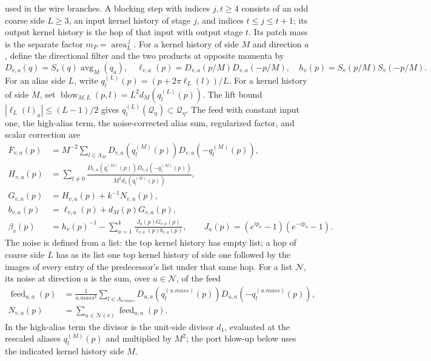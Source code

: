 used in the wire branches. A blocking step with indices $j,t\geq4$ consists of an
odd coarse side $L\geq3$, an input kernel history of stage $j$, and indices
$t\leq j\leq t+1$; its output kernel history is the hop of that input with output
stage $t$. Its patch mass is the separate factor
$m_P=\operatorname{area}_L^{\,j}$.
For a kernel history of side $M$ and direction $a$, define the directional filter and the two products at opposite momenta by
\[
 D_{v,a}(q)=S_v(q)\operatorname{avg}_M(q_a),\quad
 \ell_{v,a}(p)=D_{v,a}(p/M)D_{v,a}(-p/M),\quad
 h_v(p)=S_v(p/M)S_v(-p/M).
\]
For an alias side $L$, write $q_l^{(L)}(p)=(p+2\pi\ell_L(l))/L$. For a kernel history of side $M$, set $\operatorname{blow}_{M,L}(p,l)=L^2d_M(q_l^{(L)}(p))$. The lift bound $|\ell_L(l)_a|\leq(L-1)/2$ gives $q_l^{(L)}(\mathcal Q_\eta)\subset\mathcal Q_\eta$. The feed with constant
input one, the high-alias term, the noise-corrected alias sum, regularized factor, and scalar correction are
\[
\begin{aligned}
 F_{v,a}(p)&=M^{-2}\sum_{l\in\Lambda_M}
       D_{v,a}(q_l^{(M)}(p))D_{v,a}(-q_l^{(M)}(p)),\\
 H_{v,a}(p)&=\sum_{l\ne0}
       \frac{D_{v,a}(q_l^{(M)}(p))D_{v,a}(-q_l^{(M)}(p))}
            {M^2d_1(q_l^{(M)}(p))},\\
 G_{v,a}(p)&=H_{v,a}(p)+k^{-1}N_{v,a}(p),\\
 b_{v,a}(p)&=\ell_{v,a}(p)+d_M(p)G_{v,a}(p),\\
 \beta_v(p)&=h_v(p)^{-1}-\sum_{a=1}^4
      \frac{J_a(p)G_{v,a}(p)}{\ell_{v,a}(p)b_{v,a}(p)},
 \qquad J_a(p)=(e^{ip_a}-1)(e^{-ip_a}-1).
\end{aligned}
\]
The noise is defined from a list: the top kernel history has empty list; a hop of
coarse side $L$ has as its list one top kernel history of side one followed by the
images of every entry of the predecessor's list under that same hop.
For a list $\mathcal N$, its noise at direction $a$ is the sum, over
$u\in\mathcal N$, of the feed
\begin{align*}
 \operatorname{feed}_{u,a}(p)&=\frac1{u.mass^2}
   \sum_{l\in\Lambda_{u.mass}}
      D_{u,a}(q_l^{(u.mass)}(p))D_{u,a}(-q_l^{(u.mass)}(p)),\\
 N_{v,a}(p)&=\sum_{u\in\mathcal N(v)}\operatorname{feed}_{u,a}(p).
\end{align*}
In the high-alias term the divisor is the unit-side divisor $d_1$,
evaluated at the rescaled aliases $q_l^{(M)}(p)$ and multiplied by $M^2$;
the port blow-up below uses the indicated kernel history side $M$.

